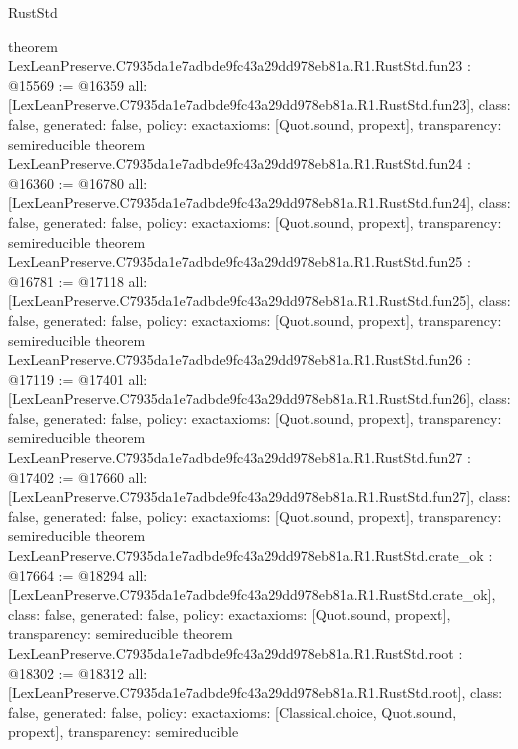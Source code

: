 \begin{lexlean}{RustStd}
\begin{coremodule}
{}
theorem LexLeanPreserve.C7935da1e7adbde9fc43a29dd978eb81a.R1.RustStd.fun23 : @15569 := @16359 {
  all: [LexLeanPreserve.C7935da1e7adbde9fc43a29dd978eb81a.R1.RustStd.fun23],
  class: false,
  generated: false,
  policy: exact{axioms: [Quot.sound, propext]},
  transparency: semireducible
}
theorem LexLeanPreserve.C7935da1e7adbde9fc43a29dd978eb81a.R1.RustStd.fun24 : @16360 := @16780 {
  all: [LexLeanPreserve.C7935da1e7adbde9fc43a29dd978eb81a.R1.RustStd.fun24],
  class: false,
  generated: false,
  policy: exact{axioms: [Quot.sound, propext]},
  transparency: semireducible
}
theorem LexLeanPreserve.C7935da1e7adbde9fc43a29dd978eb81a.R1.RustStd.fun25 : @16781 := @17118 {
  all: [LexLeanPreserve.C7935da1e7adbde9fc43a29dd978eb81a.R1.RustStd.fun25],
  class: false,
  generated: false,
  policy: exact{axioms: [Quot.sound, propext]},
  transparency: semireducible
}
theorem LexLeanPreserve.C7935da1e7adbde9fc43a29dd978eb81a.R1.RustStd.fun26 : @17119 := @17401 {
  all: [LexLeanPreserve.C7935da1e7adbde9fc43a29dd978eb81a.R1.RustStd.fun26],
  class: false,
  generated: false,
  policy: exact{axioms: [Quot.sound, propext]},
  transparency: semireducible
}
theorem LexLeanPreserve.C7935da1e7adbde9fc43a29dd978eb81a.R1.RustStd.fun27 : @17402 := @17660 {
  all: [LexLeanPreserve.C7935da1e7adbde9fc43a29dd978eb81a.R1.RustStd.fun27],
  class: false,
  generated: false,
  policy: exact{axioms: [Quot.sound, propext]},
  transparency: semireducible
}
theorem LexLeanPreserve.C7935da1e7adbde9fc43a29dd978eb81a.R1.RustStd.crate_ok : @17664 := @18294 {
  all: [LexLeanPreserve.C7935da1e7adbde9fc43a29dd978eb81a.R1.RustStd.crate_ok],
  class: false,
  generated: false,
  policy: exact{axioms: [Quot.sound, propext]},
  transparency: semireducible
}
theorem LexLeanPreserve.C7935da1e7adbde9fc43a29dd978eb81a.R1.RustStd.root : @18302 := @18312 {
  all: [LexLeanPreserve.C7935da1e7adbde9fc43a29dd978eb81a.R1.RustStd.root],
  class: false,
  generated: false,
  policy: exact{axioms: [Classical.choice, Quot.sound, propext]},
  transparency: semireducible
}


\end{coremodule}
\end{lexlean}
